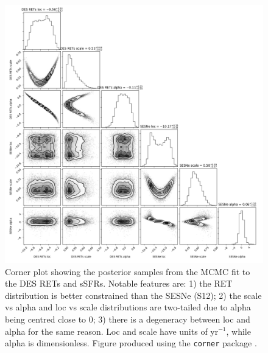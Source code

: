 \documentclass[fleqn,usenatbib,]{mnras}
\begin{document}
\begin{figure}
\includegraphics[width=\textwidth]{mc_figs/rets_s12_ssfr_corner_final.png}
\caption{Corner plot showing the posterior samples from the MCMC fit to the DES RETs and \citet{Sanders2012} sSFRs. Notable features are: 1) the RET distribution is better constrained than the SESNe (S12); 2) the scale vs alpha and loc vs scale distributions are two-tailed due to alpha being centred close to 0; 3) there is a degeneracy between loc and alpha for the same reason. Loc and scale have units of yr$^{-1}$, while alpha is dimensionless. Figure produced using the \texttt{corner} package \citep{Foreman-Mackey2016}.
\label{fig:corner}}
\end{figure}
\end{document}
